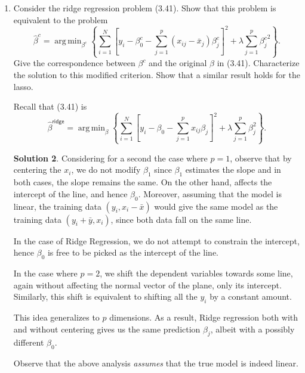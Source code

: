 \documentclass[]{book}
\theoremstyle{definition}
\newtheorem*{soln}{Solution}
\newcommand{\DD}{\mathbf{D}}
\newcommand{\ZZ}{\mathbf{Z}}
\newcommand{\RR}{\mathbf{R}}
\newcommand{\QQ}{\mathbf{Q}}
\newcommand{\yy}{\mathbf{y}}
\newcommand{\ridge}{\textsf{ridge}}
\DeclareMathOperator*{\argmin}{arg\,min} \DeclareMathOperator*{\Cov}{Cov}
\begin{document}
\begin{enumerate}
\begin{soln}
		In other words, $\hat\beta=(\DD\RR)^{-1}\ZZ^T\yy$ and
		\begin{equation}
			\begin{split}
				\hat\beta &= (\DD\RR)^{-1}\ZZ^T\yy \\
				&= \RR^{-1}\DD^{-1}\ZZ^T\yy \\
				&= \RR^{-1}\QQ^T\yy
			\end{split}
		\end{equation}
	\end{soln}

	\item\label{ex:3.5} Consider the ridge regression problem (3.41). Show that 
	this problem is equivalent to the problem
	\begin{equation}
		\hat\beta^c = \argmin_{\beta^c}\left\{\sum_{i=1}^N\left[y_i-\beta_0^c-\sum_{j=1}^p(x_{ij}-\bar{x}_j)\beta_j^c\right]^2 + \lambda\sum_{j=1}^p{\beta_j^c}^2\right\}.
		\tag{3.85}
	\end{equation}
	Give the correspondence between $\beta^c$ and the original $\beta$ in (3.41).
	Characterize the solution to this modified criterion. Show that a similar
	result holds for the lasso.

	Recall that (3.41) is
	\begin{equation}
		\hat\beta^\ridge = \argmin_{\beta}\left\{\sum_{i=1}^N\left[y_i-\beta_0-\sum_{j=1}^px_{ij}\beta_j\right]^2 + \lambda\sum_{j=1}^p\beta_j^2\right\}.
		\tag{3.41}
	\end{equation}

	\begin{soln}
		Considering for a second the case where $p=1$, observe that by 
		centering the $x_i$, we do not modify $\beta_1$ since $\beta_1$
		estimates the slope and in both cases, the slope remains the same.
		On the other hand, affects the intercept of the line, and hence 
		$\beta_0$. Moreover, assuming that the model is linear,
		the training data $(y_i,x_i-\bar x)$ would give the same model as 
		the training data $(y_i+\bar y,x_i)$, since both data fall on the 
		same line.

		In the case of Ridge Regression, we do not attempt to constrain the
		intercept, hence $\beta_0$ is free to be picked as the intercept of 
		the line.

		In the case where $p=2$, we shift the dependent variables towards some 
		line, again without affecting the normal vector of the plane, only its
		intercept. Similarly, this shift is equivalent to shifting all the
		$y_i$ by a constant amount.

		This idea generalizes to $p$ dimensions. As a result, Ridge regression 
		both with and without centering gives us the same prediction $\beta_j$,
		albeit with a possibly different $\beta_0$.

		Observe that the above analysis \emph{assumes} that the true model is indeed 
		linear.
	\end{soln}
\end{enumerate}
\end{document}
